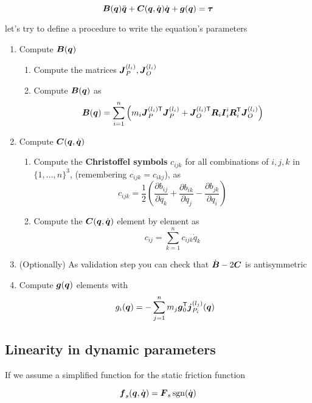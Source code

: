 \begin{equation*}
	\boldsymbol{B}(\boldsymbol{q})\ddot{\boldsymbol{q}} + \boldsymbol{C}(\boldsymbol{q},\dot{\boldsymbol{q}})\dot{\boldsymbol{q}} + \boldsymbol{g}(\boldsymbol{q}) = \boldsymbol{\tau}
\end{equation*}

let's try to define a procedure to write the equation's parameters

\begin{enumerate}
	\item Compute $\boldsymbol{B}(\boldsymbol{q})$
	\begin{enumerate}[label*=\arabic*.]
		\item Compute the matrices $\boldsymbol{J}_P^{(l_i)}, \boldsymbol{J}_O^{(l_i)}$
		\item Compute $\boldsymbol{B}(\boldsymbol{q})$ as
		\[
			\boldsymbol{B}(\boldsymbol{q}) = \sum_{i=1}^n \left( m_i \boldsymbol{J}_P^{(l_i)\mathsf{T}} \boldsymbol{J}_P^{(l_i)} +
			\boldsymbol{J}_O^{(l_i)\mathsf{T}} \boldsymbol{R}_i \boldsymbol{I}_i^i \boldsymbol{R}_i^{\mathsf{T}} \boldsymbol{J}_O^{(l_i)} \right)
		\]
	\end{enumerate}

	\item Compute $\boldsymbol{C}(\boldsymbol{q},\dot{\boldsymbol{q}})$
	\begin{enumerate}[label*=\arabic*.]
		\item Compute the \textbf{Christoffel symbols} $c_{ijk}$ for all combinations of $i,j,k$ in $\{1,\dots,n\}^3$, (remembering $c_{ijk} = c_{ikj}$), as
		\[
			c_{ijk} = \frac{1}{2} \left( \frac{\partial b_{ij}}{\partial q_k}
			+ \frac{\partial b_{ik}}{\partial q_j} - \frac{\partial b_{jk}}{\partial q_i} \right)
		\]
		\item Compute the $\boldsymbol{C}(\boldsymbol{q},\dot{\boldsymbol{q}})$ element by element as
		\[
			c_{ij} = \sum_{k=1}^n c_{ijk}\dot{q}_k
		\]
	\end{enumerate}

	\item (Optionally) As validation step you can check that $\dot{\boldsymbol{B}}-2\boldsymbol{C}$ is antisymmetric

	\item Compute $\boldsymbol{g}(\boldsymbol{q})$ elements with
	\[
		g_i(\boldsymbol{q}) = - \sum_{j=1}^n m_j \boldsymbol{g}_0^{\mathsf{T}} \boldsymbol{j}_{P_i}^{(l_j)}(\boldsymbol{q})
	\]
\end{enumerate}


\subsection{Linearity in dynamic parameters}\label{subsec:linearity-in-dynamic-parameters}

If we assume a simplified function for the static friction function

\[
	\boldsymbol{f}_s(\boldsymbol{q},\dot{\boldsymbol{q}}) = \boldsymbol{F}_s\operatorname{sgn}(\dot{\boldsymbol{q}})
\]

